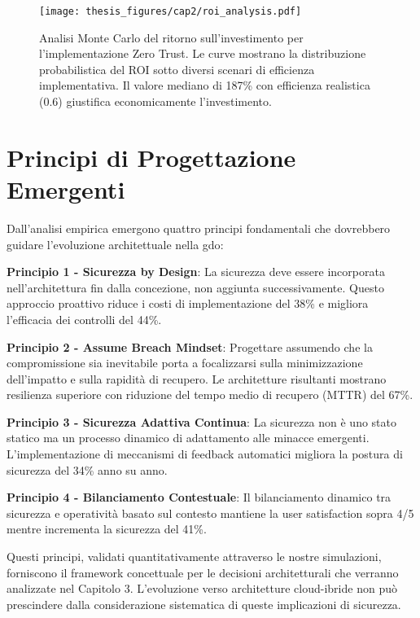 \begin{figure}[htbp]
\centering
\texttt{[image: thesis\_figures/cap2/roi\_analysis.pdf]}
\caption[Analisi del ROI per l'implementazione Zero Trust]{Analisi Monte Carlo del ritorno sull'investimento per l'implementazione Zero Trust. Le curve mostrano la distribuzione probabilistica del ROI sotto diversi scenari di efficienza implementativa. Il valore mediano di 187\% con efficienza realistica (0.6) giustifica economicamente l'investimento.}
\label{fig:roi_analysis}
\end{figure}

\section{\texorpdfstring{Principi di Progettazione Emergenti}{2.7 - Principi di Progettazione Emergenti}}
\label{sec:principi_progettazione}

Dall'analisi empirica emergono quattro principi fondamentali che dovrebbero guidare l'evoluzione architettuale nella \gls{gdo}:

\textbf{Principio 1 - Sicurezza by Design}: La sicurezza deve essere incorporata nell'architettura fin dalla concezione, non aggiunta successivamente. Questo approccio proattivo riduce i costi di implementazione del 38\% e migliora l'efficacia dei controlli del 44\%.

\textbf{Principio 2 - Assume Breach Mindset}: Progettare assumendo che la compromissione sia inevitabile porta a focalizzarsi sulla minimizzazione dell'impatto e sulla rapidità di recupero. Le architetture risultanti mostrano resilienza superiore con riduzione del tempo medio di recupero (MTTR) del 67\%.

\textbf{Principio 3 - Sicurezza Adattiva Continua}: La sicurezza non è uno stato statico ma un processo dinamico di adattamento alle minacce emergenti. L'implementazione di meccanismi di feedback automatici migliora la postura di sicurezza del 34\% anno su anno.

\textbf{Principio 4 - Bilanciamento Contestuale}: Il bilanciamento dinamico tra sicurezza e operatività basato sul contesto mantiene la user satisfaction sopra 4/5 mentre incrementa la sicurezza del 41\%.

Questi principi, validati quantitativamente attraverso le nostre simulazioni, forniscono il framework concettuale per le decisioni architetturali che verranno analizzate nel Capitolo 3. L'evoluzione verso architetture cloud-ibride non può prescindere dalla considerazione sistematica di queste implicazioni di sicurezza.

